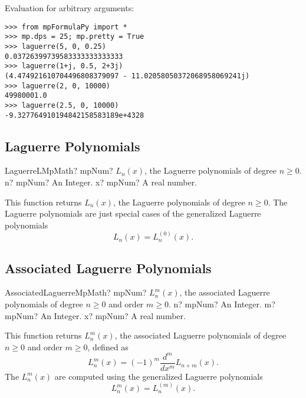 Evaluation for arbitrary arguments:

\begin{lstlisting}
>>> from mpFormulaPy import *
>>> mp.dps = 25; mp.pretty = True
>>> laguerre(5, 0, 0.25)
0.03726399739583333333333333
>>> laguerre(1+j, 0.5, 2+3j)
(4.474921610704496808379097 - 11.02058050372068958069241j)
>>> laguerre(2, 0, 10000)
49980001.0
>>> laguerre(2.5, 0, 10000)
-9.327764910194842158583189e+4328
\end{lstlisting}




\subsection{Laguerre Polynomials}

\begin{mpFunctionsExtract}
	\mpFunctionTwoNotImplemented
	{LaguerreLMpMath? mpNum? $L_n (x)$, the Laguerre polynomials of degree $n \geq 0$.}
	{n? mpNum? An Integer.}
	{x? mpNum? A real number.}
\end{mpFunctionsExtract}

\vspace{0.3cm}
This function returns $L_n (x)$, the Laguerre polynomials of degree $n \geq 0$. The Laguerre polynomials are just special cases of the generalized Laguerre polynomials
\begin{equation}
L_n (x) = L^{(0)}_n (x).
\end{equation}



\subsection{Associated Laguerre Polynomials}


\begin{mpFunctionsExtract}
	\mpFunctionThreeNotImplemented
	{AssociatedLaguerreMpMath? mpNum? $L^m_n (x)$, the associated Laguerre polynomials of degree $n \geq 0$ and order $m \geq 0$.}
	{n? mpNum? An Integer.}
	{m? mpNum? An Integer.}
	{x? mpNum? A real number.}
\end{mpFunctionsExtract}

\vspace{0.3cm}
This function returns $L^m_n (x)$, the associated Laguerre polynomials of degree $n \geq 0$ and order $m \geq 0$, defined as
\begin{equation}
L^m_n (x) = (-1)^m \frac{d^m}{dx^m} L_{n+m} (x).
\end{equation}
The  $L^m_n (x)$ are computed using the generalized Laguerre polynomials
\begin{equation}
L^m_n (x) = L^{(m)}_n (x).
\end{equation}






